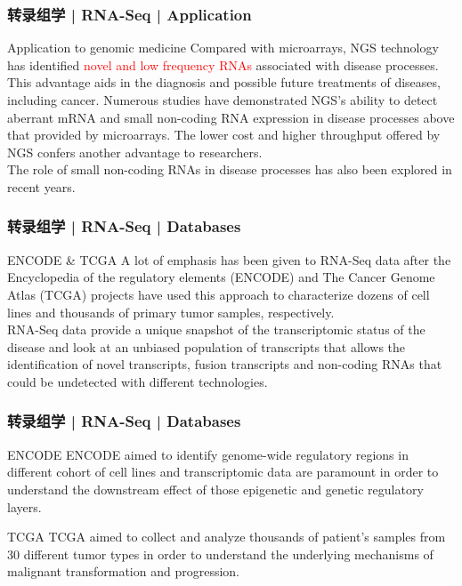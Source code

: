 \begin{frame}
  \frametitle{转录组学 | RNA-Seq | Application}
  \begin{block}{Application to genomic medicine}
    Compared with microarrays, NGS technology has identified \textcolor{red}{novel and low frequency RNAs} associated with disease processes. This advantage aids in the diagnosis and possible future treatments of diseases, including cancer. Numerous studies have demonstrated NGS's ability to detect aberrant mRNA and small non-coding RNA expression in disease processes above that provided by microarrays. The lower cost and higher throughput offered by NGS confers another advantage to researchers.\\
  \vspace{1em}
  The role of small non-coding RNAs in disease processes has also been explored in recent years.
  \end{block}
\end{frame}

\begin{frame}
  \frametitle{转录组学 | RNA-Seq | Databases}
  \begin{block}{ENCODE \& TCGA}
 A lot of emphasis has been given to RNA-Seq data after the Encyclopedia of the regulatory elements (ENCODE) and The Cancer Genome Atlas (TCGA) projects have used this approach to characterize dozens of cell lines and thousands of primary tumor samples, respectively.\\
 \vspace{1em}
 RNA-Seq data provide a unique snapshot of the transcriptomic status of the disease and look at an unbiased population of transcripts that allows the identification of novel transcripts, fusion transcripts and non-coding RNAs that could be undetected with different technologies.
  \end{block}
\end{frame}

\begin{frame}
  \frametitle{转录组学 | RNA-Seq | Databases}
  \begin{block}{ENCODE}
    ENCODE aimed to identify genome-wide regulatory regions in different cohort of cell lines and transcriptomic data are paramount in order to understand the downstream effect of those epigenetic and genetic regulatory layers.
  \end{block}
  \pause
  \begin{block}{TCGA}
    TCGA aimed to collect and analyze thousands of patient's samples from 30 different tumor types in order to understand the underlying mechanisms of malignant transformation and progression.
  \end{block}
\end{frame}

